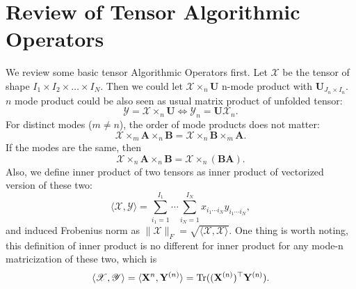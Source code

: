 \section{Review of Tensor Algorithmic Operators}
\label{sec:review_tensor}
We review some basic tensor Algorithmic Operators first. Let $\mathscr{X}$ be the tensor of shape $I_1\times I_2\times \dots \times I_N$. Then we could let $\mathscr{X}\times_n  \mathbf{U}$ n-mode product with $\mathbf{U}_{J_n\times I_n}$. $n$ mode product could be also seen as usual matrix product of unfolded tensor:
\begin{equation}
\mathscr{Y} = \mathscr{X}\times_n \mathbf{U} \Longleftrightarrow 
\mathscr{Y}_n = \mathbf{U} \mathscr{X}_n. 
\end{equation}
For distinct modes ($m\neq n$), the order of mode products does not matter:
\begin{equation}
\label{eq: tensor_product_mul_exchangable}
\mathscr{X}\times_m \mathbf{A} \times_n \mathbf{B} =    \mathscr{X}\times_n \mathbf{B} \times_m \mathbf{A}. 
\end{equation}
If the modes are the same, then 
\begin{equation}
\label{eq: tensor_product_association}
\mathscr{X}\times_n \mathbf{A} \times_n \mathbf{B} =    \mathscr{X}\times_n (\mathbf{BA}). 
\end{equation}
Also, we define inner product of two tensors as inner product of vectorized version of these two:
\begin{equation}
\langle \mathscr{X}, \mathscr{Y}\rangle = \sum_{i_1=1}^{I_1}\cdots \sum_{i_N=1}^{I_N} x_{i_1\cdots i_N}y_{i_1\cdots i_N},
\end{equation}
and induced Frobenius norm as $\|\mathscr{X}\|_F = \sqrt{\langle \mathscr{X}, \mathscr{X} \rangle}$. One thing is worth noting, this definition of inner product is no different for inner product for any mode-n matricization of these two, which is 
\begin{equation}
\label{eq:F_norm_equivalent}
\langle \mathscr{X}, \mathscr{Y}\rangle = \langle \mathbf{X}^{n}, \mathbf{Y}^{(n)}\rangle = \rm{Tr}((\mathbf{X}^{(n)})^\top \mathbf{Y}^{(n)}). 
\end{equation}